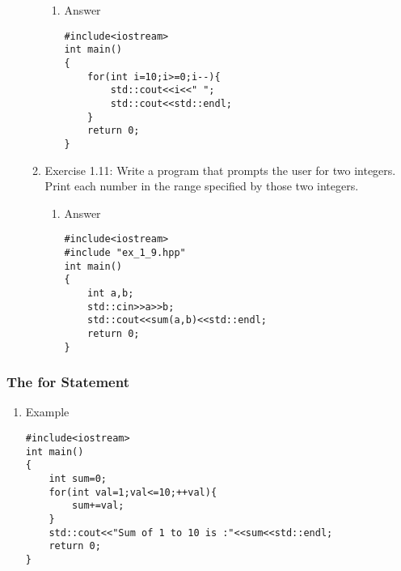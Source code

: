 \documentclass[11pt]{article}
\begin{document}
\begin{enumerate}
\begin{enumerate}
\label{sec-1-4-1-3-2}
\begin{enumerate}
\item Answer
\label{sec-1-4-1-3-2-1}
\begin{verbatim}
#include<iostream>
int main()
{
    for(int i=10;i>=0;i--){
        std::cout<<i<<" ";
        std::cout<<std::endl;
    }
    return 0;
}
\end{verbatim}
\end{enumerate}
\item Exercise 1.11: Write a program that prompts the user for two integers. Print each number in the range specified by those two integers.
\label{sec-1-4-1-3-3}
\begin{enumerate}
\item Answer
\label{sec-1-4-1-3-3-1}
\begin{verbatim}
#include<iostream>
#include "ex_1_9.hpp"
int main()
{
    int a,b;
    std::cin>>a>>b;
    std::cout<<sum(a,b)<<std::endl;
    return 0;
}
\end{verbatim}
\end{enumerate}
\end{enumerate}
\end{enumerate}
\subsubsection{The for Statement}
\label{sec-1-4-2}
\begin{enumerate}
\item Example
\label{sec-1-4-2-1}
\begin{verbatim}
#include<iostream>
int main()
{
    int sum=0;
    for(int val=1;val<=10;++val){
        sum+=val;
    }
    std::cout<<"Sum of 1 to 10 is :"<<sum<<std::endl;
    return 0;
}
\end{verbatim}
\end{enumerate}
\end{document}
